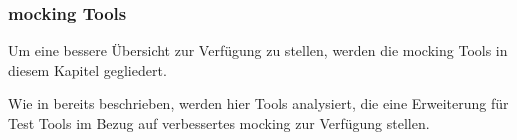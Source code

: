 \subsubsection{\Gls{mock}ing Tools}\label{python-tools:extlib:mock}

Um eine bessere Übersicht zur Verfügung zu stellen, werden die \Gls{mock}ing
Tools in diesem Kapitel gegliedert.

Wie in  bereits beschrieben, werden hier Tools analysiert,
die eine Erweiterung für Test Tools im Bezug auf verbessertes \gls{mock}ing zur 
Verfügung stellen.




